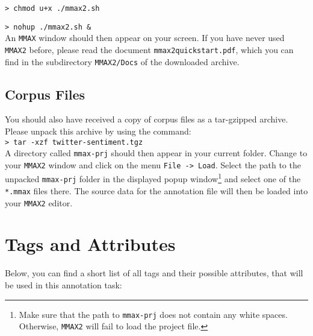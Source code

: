 \documentclass[11pt,a4paper]{article}
\begin{document}
\texttt{> chmod u+x ./mmax2.sh}

\texttt{> nohup ./mmax2.sh \&} \\\newline
       {\setlength{\parindent}{0pt}An \texttt{MMAX} window should then
         appear on your screen.  If you have never used \texttt{MMAX2}
         before, please read the document
         \texttt{mmax2quickstart.pdf}, which you can find in the
         subdirectory \texttt{MMAX2/Docs} of the downloaded archive.}

\subsection{Corpus Files}

You should also have received a copy of corpus files as a tar-gzipped
archive.  Please unpack this archive by using the command:\\\newline
\texttt{> tar -xzf twitter-sentiment.tgz}\\\newline
       {\setlength{\parindent}{0pt} A directory called
         \texttt{mmax-prj} should then appear in your current folder.
         Change to your \texttt{MMAX2} window and click on the menu
         \texttt{File -> Load}.  Select the path to the unpacked
         \texttt{mmax-prj} folder in the displayed popup
         window\footnote{Make sure that the path to \texttt{mmax-prj}
           does not contain any white spaces.  Otherwise,
           \texttt{MMAX2} will fail to load the project file.} and
         select one of the \texttt{*.mmax} files there. The source
         data for the annotation file will then be loaded into your
         \texttt{MMAX2} editor.}


\section{Tags and Attributes}\label{sec:markables}
Below, you can find a short list of all tags and their possible
attributes, that will be used in this annotation task:
\end{document}
